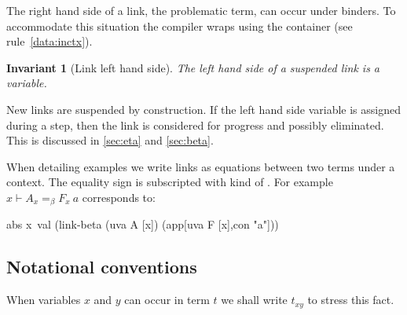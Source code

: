 \documentclass[sigconf,natbib=false,review]{acmart}
\newtheorem{invariant}{Invariant}
\newcommand{\linkbetaM}[3]{\ensuremath{#1 \vdash #2 =_\beta #3}}
\begin{document}


\noindent
The right hand side of a link, the problematic term, can occur under binders.
To accommodate this situation the compiler wraps  using
the  container (see rule~\ref{data:inctx}).

\begin{invariant}[Link left hand side]\label{inv:linklhs}
  The left hand side of a suspended link
  is a variable.
\end{invariant}

\noindent
New links are suspended by construction.
If the left hand side variable is assigned during a step, then 
the link is considered for progress and possibly eliminated.
This is discussed in \cref{sec:eta} and \cref{sec:beta}.

When detailing examples we write links as equations between two
terms under a context.
The equality sign is subscripted with
kind of . For example $\linkbetaM{x}{A_x}{F_x~a}$ corresponds to:
\begin{elpicode}
abs x\ val (link-beta (uva A [x]) (app[uva F [x],con "a"]))
\end{elpicode}

\subsection{Notational conventions}

When variables $x$ and $y$ can occur in term $t$ we shall write
$t_{xy}$ to stress this fact. 


\end{document}
